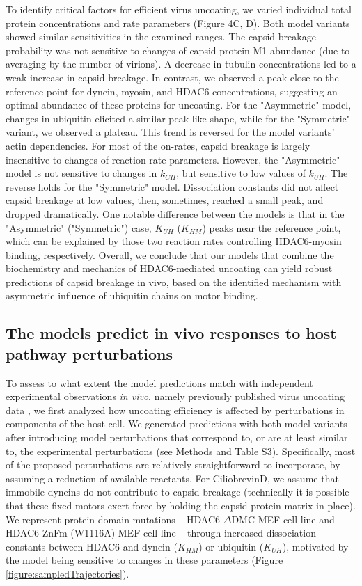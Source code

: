 To identify critical factors for efficient virus uncoating, we varied individual total protein concentrations and rate parameters (Figure 4C, D). Both model variants showed similar sensitivities in the examined ranges. The capsid breakage probability was not sensitive to changes of capsid protein M1 abundance (due to averaging by the number of virions). A decrease in tubulin concentrations led to a weak increase in capsid breakage. In contrast, we observed a peak close to the reference point for dynein, myosin, and HDAC6 concentrations, suggesting an optimal abundance of these proteins for uncoating. For the "Asymmetric" model, changes in ubiquitin elicited a similar peak-like shape, while for the "Symmetric" variant, we observed a plateau. This trend is reversed for the model variants’ actin dependencies. For most of the on-rates, capsid breakage is largely insensitive to changes of reaction rate parameters. However, the "Asymmetric" model is not sensitive to changes in  $k_{CH}$, but sensitive to low values of $k_{UH}$. The reverse holds for the "Symmetric" model. Dissociation constants did not affect capsid breakage at low values, then, sometimes, reached a small peak, and dropped dramatically. One notable difference between the models is that in the "Asymmetric" ("Symmetric") case, $K_{UH}$ ($K_{HM}$) peaks near the reference point, which can be explained by those two reaction rates controlling HDAC6-myosin binding, respectively. Overall, we conclude that our models that combine the biochemistry and mechanics of HDAC6-mediated uncoating can yield robust predictions of capsid breakage in vivo, based on the identified mechanism with asymmetric influence of ubiquitin chains on motor binding.

\subsection{The models predict in vivo responses to host pathway perturbations}

To assess to what extent the model predictions match with independent experimental observations \textit{in vivo}, namely previously published virus uncoating data \cite{banerjee2014influenza}, we first analyzed how uncoating efficiency is affected by perturbations in components of the host cell. We generated predictions with both model variants after introducing model perturbations that correspond to, or are at least similar to, the experimental perturbations (see Methods and Table S3). Specifically, most of the proposed perturbations are relatively straightforward to incorporate, by assuming a reduction of available reactants. For CiliobrevinD, we assume that immobile dyneins do not contribute to capsid breakage (technically it is possible that these fixed motors exert force by holding the capsid protein matrix in place). We represent protein domain mutations – HDAC6 $\Delta$DMC MEF cell line and HDAC6 ZnFm (W1116A) MEF cell line – through increased dissociation constants between HDAC6 and dynein ($K_{HM}$) or ubiquitin ($K_{UH}$), motivated by the model being sensitive to changes in these parameters (Figure \ref{figure:sampledTrajectories}).


